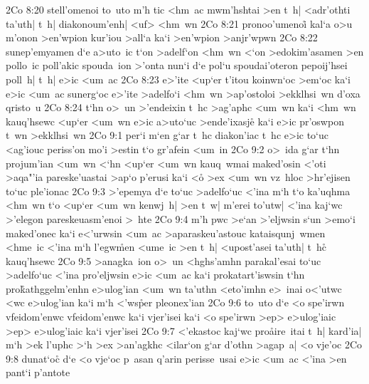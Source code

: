 \vs 2Co 8:20
stell'omenoi
to~uto
m'h
tic
<hm~ac
mwm'hshtai
>en
t~h|
<adr'othti
ta'uth|
t~h|
diakonoum'enh|
<uf>
<hm~wn\bibvsend
\vs 2Co 8:21
pronoo'umenoi\r{}
kal`a
o>u
m'onon
>en'wpion
kur'iou
>all`a
ka`i
>en'wpion
>anjr'wpwn\bibvsend
\vs 2Co 8:22
sunep'emyamen
d`e
a>uto~ic
t`on
>adelf`on
<hm~wn
<`on
>edokim'asamen
>en
pollo~ic
poll'akic
spouda~ion
>'onta
nun`i
d`e
pol`u
spoudai'oteron
pepoij'hsei
poll~h|
t~h|
e>ic
<um~ac\bibvsend
\vs 2Co 8:23
e>'ite
<up`er
t'itou
koinwn`oc
>em`oc
ka`i
e>ic
<um~ac
sunerg`oc
e>'ite
>adelfo`i
<hm~wn
>ap'ostoloi
>ekklhsi~wn
d'oxa
qristo~u\bibvsend
\vs 2Co 8:24
t`hn
o>~un
>'endeixin
t~hc
>ag'aphc
<um~wn
ka`i
<hm~wn
kauq'hsewc
<up`er
<um~wn
e>ic
a>uto`uc
>ende'ixasje\r{}
ka`i
e>ic
pr'oswpon
t~wn
>ekklhsi~wn\bibvsend
\vs 2Co 9:1
per`i
m`en
g`ar
t~hc
diakon'iac
t~hc
e>ic
to`uc
<ag'iouc
periss'on
mo'i
>estin
t`o
gr'afein
<um~in\bibvsend
\vs 2Co 9:2
o>~ida
g`ar
t`hn
projum'ian
<um~wn
<`hn
<up`er
<um~wn
kauq~wmai
maked'osin
<'oti
>aqa"'ia
pareske'uastai
>ap`o
p'erusi
ka`i
<o\r{}
>ex
<um~wn
vz~hloc
>hr'ejisen
to`uc
ple'ionac\bibvsend
\vs 2Co 9:3
>'epemya
d`e
to`uc
>adelfo`uc
<'ina
m`h
t`o
ka'uqhma
<hm~wn
t`o
<up`er
<um~wn
kenwj~h|
>en
t~w|
m'erei
to'utw|
<'ina
kaj`wc
>'elegon
pareskeuasm'enoi
>~hte\bibvsend
\vs 2Co 9:4
m'h
pwc
>e`an
>'eljwsin
s`un
>emo`i
maked'onec
ka`i
e<'urwsin
<um~ac
>aparaskeu'astouc
kataisqunj~wmen
<hme~ic
<'ina
m`h
l'egw\r{m}en
<ume~ic
>en
t~h|
<upost'asei
ta'uth|
t~hc\r{}
kauq'hsewc\bibvsend
\vs 2Co 9:5
>anagka~ion
o>~un
<hghs'amhn
parakal'esai
to`uc
>adelfo`uc
<'ina
pro'eljwsin
e>ic
<um~ac
ka`i
prokatart'iswsin
t`hn
pro\r{k}athggelm'enhn
e>ulog'ian
<um~wn
ta'uthn
<eto'imhn
e>~inai
o<'utwc
<wc
e>ulog'ian
ka`i
m`h
<'ws\r{p}er
pleonex'ian\bibvsend
\vs 2Co 9:6
to~uto
d`e
<o
spe'irwn
vfeidom'enwc
vfeidom'enwc
ka`i
vjer'isei
ka`i
<o
spe'irwn
>ep>
e>ulog'iaic
>ep>
e>ulog'iaic
ka`i
vjer'isei\bibvsend
\vs 2Co 9:7
<'ekastoc
kaj`wc
pro\r{a}ire~itai
t~h|
kard'ia|
m`h
>ek
l'uphc
>`h
>ex
>an'agkhc
<ilar`on
g`ar
d'othn
>agap~a|
<o
vje'oc\bibvsend
\vs 2Co 9:8
dunat`o\r{c}
d`e
<o
vje`oc
p~asan
q'arin
perisse~usai
e>ic
<um~ac
<'ina
>en
pant`i
p'antote
